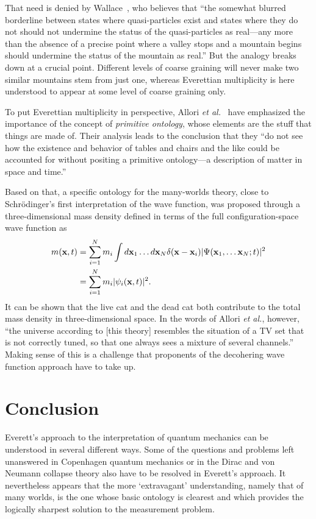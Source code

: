 \documentclass[12pt]{article}
\begin{document}
That need is denied by Wallace~\cite{wallace2}, who
believes that ``the somewhat blurred borderline between
states where quasi-particles exist and states where they do
not should not undermine the status of the quasi-particles
as real---any more than the absence of a precise point
where a valley stops and a mountain begins should
undermine the status of the mountain as real.''
But the analogy breaks down at a crucial point.
Different levels of coarse graining will never make
two similar mountains stem from just one, whereas
Everettian multiplicity is here understood to appear
at some level of coarse graining only.

To put Everettian multiplicity in perspective,
Allori \emph{et al.}~\cite{allori1} have emphasized
the importance of the concept of \emph{primitive
ontology}, whose elements are the stuff that things
are made of.  Their analysis leads to the
conclusion that they ``do not
see how the existence and behavior of tables and
chairs and the like could be accounted for without
positing a primitive ontology---a description
of matter in space and time.''

Based on that, a specific ontology
for the many-worlds theory, close to Schr\"{o}dinger's
first interpretation of the wave function, was proposed
through a three-dimensional mass density defined
in terms of the full configuration-space
wave function as~\cite{allori2}
%
\begin{align}
m(\mathbf{x},t) &= \sum_{i=1}^N m_i \int
d\mathbf{x}_1 \ldots d\mathbf{x}_N
\delta (\mathbf{x} - \mathbf{x}_i )
|\Psi (\mathbf{x}_1, \ldots \mathbf{x}_N; t)|^2
\notag \\
&= \sum_{i=1}^N m_i |\psi_i (\mathbf{x}, t)|^2 .
\end{align}
%
It can be shown that the live cat and the dead cat
both contribute to the total mass density in
three-dimensional space.  In the words of Allori
\emph{et al.}, however, ``the universe according to
[this theory] resembles the situation of a TV set
that is not correctly tuned, so that one always
sees a mixture of several channels.''  Making sense
of this is a challenge that proponents of the
decohering wave function approach have to take up.
%
\section{Conclusion}
\label{sec5}
%
Everett's approach to the interpretation of
quantum mechanics can be understood in several
different ways.  Some of the questions and
problems left unanswered in Copenhagen quantum
mechanics or in the Dirac and von Neumann collapse
theory also have to be resolved in Everett's
approach.  It nevertheless appears that the more
`extravagant' understanding, namely that of many
worlds, is the one whose basic ontology is
clearest and which provides the logically sharpest
solution to the measurement problem.
%
\end{document}
